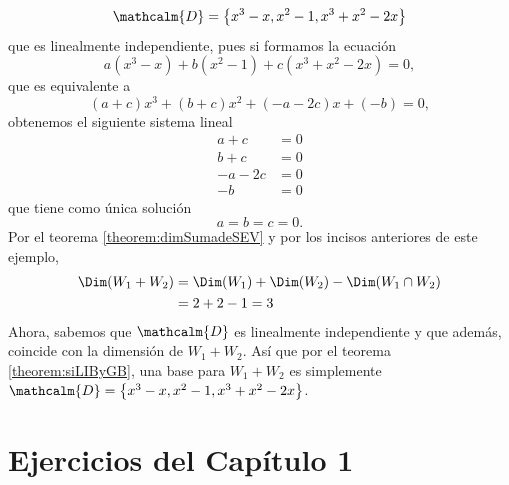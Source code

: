 \begin{examplebox}{}{}
\begin{enumerate}[label=\alph*), topsep=6pt, itemsep=0pt]
        $$\mathcalm{D} = \left\{ x^3 - x, x^2 - 1, x^3 + x^2 - 2x \right\}$$
        que es linealmente independiente, pues si formamos la ecuación
        $$a\left(x^3 - x\right) + b\left(x^2 - 1\right) + c\left(x^3 + x^2 - 2x\right) = 0,$$
        que es equivalente a
        $$(a + c)x^3 + (b + c)x^2 + (-a - 2c)x + (-b) = 0,$$
        obtenemos el siguiente sistema lineal
        \begin{align*}
            a + c & = 0 \\
            b + c & = 0 \\
            -a - 2c & = 0 \\
            -b & = 0
        \end{align*}
        que tiene como única solución
        $$a = b = c = 0.$$
        Por el teorema \ref{theorem:dimSumadeSEV} y por los incisos anteriores de este ejemplo,
        \begin{align*}
            \Dim(W_1 + W_2) & = \Dim(W_1) + \Dim(W_2) - \Dim(W_1 \cap W_2) \\
            & = 2 + 2 - 1 = 3
        \end{align*}
        Ahora, sabemos que $\mathcalm{D}$ es linealmente independiente y que además, coincide con la dimensión de $W_1 + W_2$. Así que por el teorema \ref{theorem:siLIByGB}, una base para $W_1 + W_2$ es simplemente $\mathcalm{D} = \left\{ x^3 - x, x^2 - 1, x^3 + x^2 - 2x \right\}$.
    \end{enumerate}
\end{examplebox}

\newpage

\section{Ejercicios del Capítulo 1}

